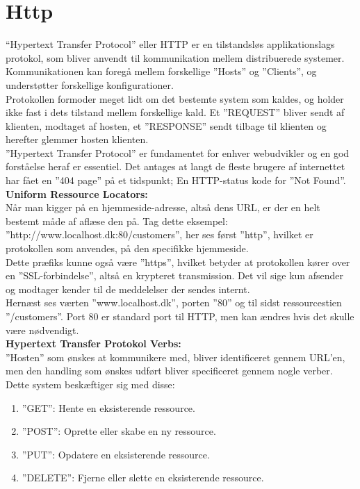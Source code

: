 \section{Http}\label{sec:http}
“Hypertext Transfer Protocol” eller HTTP\cite{HTTP} er en tilstandsløs applikationslags protokol, 
som bliver anvendt til kommunikation mellem distribuerede systemer. 
Kommunikationen kan foregå mellem forskellige ”Hosts” og ”Clients”, 
og understøtter forskellige konfigurationer.\\

Protokollen formoder meget lidt om det bestemte system som kaldes, 
og holder ikke fast i dets tilstand mellem forskellige kald. 
Et ”REQUEST” bliver sendt af klienten, modtaget af hosten, 
et ”RESPONSE” sendt tilbage til klienten og herefter glemmer hosten klienten. \\

”Hypertext Transfer Protocol” er fundamentet for enhver webudvikler 
og en god forståelse heraf er essentiel. 
Det antages at langt de fleste brugere af internettet har fået en ”404 page” på et tidspunkt; 
En HTTP-status kode for ”Not Found”. \\

\textbf{Uniform Ressource Locators:}\\
Når man kigger på en hjemmeside-adresse, altså dens URL, 
er der en helt bestemt måde af aflæse den på. 
Tag dette eksempel: ”http://www.localhost.dk:80/customers”, 
her ses først ”http”, hvilket er protokollen som anvendes, på den specifikke hjemmeside. \\

Dette præfiks kunne også være ”https”, 
hvilket betyder at protokollen kører over en ”SSL-forbindelse”, 
altså en krypteret transmission. 
Det vil sige kun afsender og modtager kender til de meddelelser der sendes internt. \\

Hernæst ses værten ”www.localhost.dk”, porten ”80” og til sidst ressourcestien ”/customers”. 
Port 80 er standard port til HTTP, men kan ændres hvis det skulle være nødvendigt. \\

\textbf{Hypertext Transfer Protokol Verbs:} \\
”Hosten” som ønskes at kommunikere med, bliver identificeret gennem URL’en, 
men den handling som ønskes udført bliver specificeret gennem nogle verber. 
Dette system beskæftiger sig med disse: \\
\begin{enumerate}
    \item ”GET”: Hente en eksisterende ressource.
    \item ”POST”: Oprette eller skabe en ny ressource.
    \item ”PUT”: Opdatere en eksisterende ressource.
    \item ”DELETE”:  Fjerne eller slette en eksisterende ressource.
\end{enumerate}

